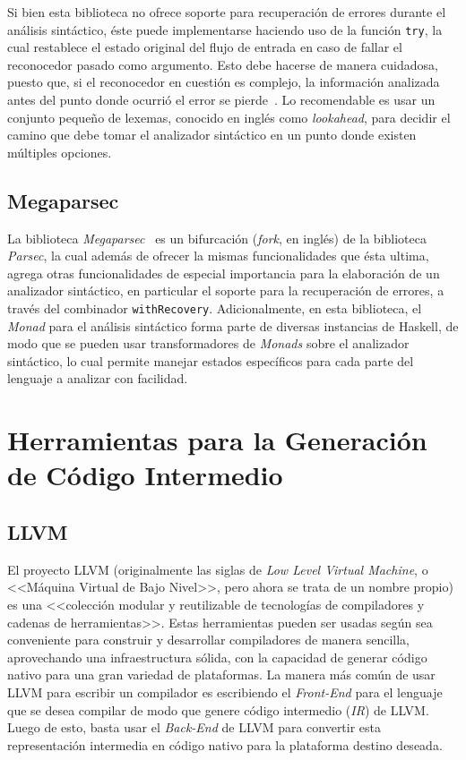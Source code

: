 Si bien esta biblioteca no ofrece soporte para recuperación de errores durante
el análisis sintáctico, éste puede implementarse haciendo uso de la función
\texttt{try}, la cual restablece el estado original del flujo de entrada en caso
de fallar el reconocedor pasado como argumento. Esto debe hacerse de manera
cuidadosa, puesto que, si el reconocedor en cuestión es complejo, la información
analizada antes del punto donde ocurrió el error se pierde~\cite{parsectry}. Lo
recomendable es usar un conjunto pequeño de lexemas, conocido en inglés como
\textit{lookahead}, para decidir el camino que debe tomar el analizador
sintáctico en un punto donde existen múltiples opciones.

\subsection{Megaparsec}

La biblioteca \textit{Megaparsec}~\cite{megaparsec} es un bifurcación
(\emph{fork}, en inglés) de la biblioteca \textit{Parsec}, la cual además de
ofrecer la mismas funcionalidades que ésta ultima, agrega otras funcionalidades
de especial importancia para la elaboración de un analizador sintáctico, en
particular el soporte para la recuperación de errores, a través del combinador
\texttt{withRecovery}. Adicionalmente, en esta biblioteca, el \textit{Monad}
para el análisis sintáctico forma parte de diversas instancias de Haskell, de
modo que se pueden usar transformadores de \textit{Monads} sobre el analizador
sintáctico, lo cual permite manejar estados específicos para cada parte del
lenguaje a analizar con facilidad.


\section{Herramientas para la Generación de Código Intermedio}

\subsection{LLVM}

El proyecto LLVM (originalmente las siglas de \textit{Low Level Virtual
Machine}, o <<Máquina Virtual de Bajo Nivel>>, pero ahora se trata de un nombre
propio) es una <<colección modular y reutilizable de tecnologías de compiladores
y cadenas de herramientas>>. Estas herramientas pueden ser usadas según sea
conveniente para construir y desarrollar compiladores de manera sencilla,
aprovechando una infraestructura sólida, con la capacidad de generar código
nativo para una gran variedad de plataformas. La manera más común de usar LLVM
para escribir un compilador es escribiendo el \textit{Front-End} para el
lenguaje que se desea compilar de modo que genere código intermedio
(\textit{IR}) de LLVM. Luego de esto, basta usar el \textit{Back-End} de LLVM
para convertir esta representación intermedia en código nativo para la
plataforma destino deseada.

